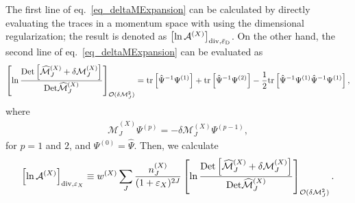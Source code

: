 \documentclass[12pt]{article}
\begin{document}
The first line of eq.~\eqref{eq_deltaMExpansion} can be calculated by
directly evaluating the traces in a momentum space with using the
dimensional regularization; the result is denoted as $\left[\ln
  \mathcal A^{(X)}\right]_{{\rm div}, \bar{\varepsilon}_{\rm D}}$. 
On the other hand, the second line of eq.~\eqref{eq_deltaMExpansion} can
be evaluated as
\begin{align}
 \left[
  \ln\frac{{\rm Det}
   \left[
    \widehat{\mathcal M}^{(X)}_J+\delta\mathcal M_J^{(X)}
   \right]}{{\rm Det} \widehat{\mathcal M}^{(X)}_J}
 \right]_{\mathcal O(\delta\mathcal M_J^2)}
 = {\rm tr}
 \left[
  \hat\Psi^{-1}\Psi^{(1)}
 \right]+{\rm tr}
 \left[
  \hat\Psi^{-1}\Psi^{(2)}
 \right]-\frac{1}{2}{\rm tr}
 \left[
  \hat\Psi^{-1}\Psi^{(1)}\hat\Psi^{-1}\Psi^{(1)}
 \right],
 \label{eq_expansionEachJ}
\end{align}
where
\begin{align}
 \widehat{\mathcal M}^{(X)}_J\Psi^{(p)} = -\delta\mathcal M_J^{(X)}\Psi^{(p-1)},
\end{align}
for $p=1$ and $2$, and $\Psi^{(0)} = \hat\Psi$. Then, we calculate
\begin{align}
  \left[
    \ln\mathcal A^{(X)}
  \right]_{{\rm div}, \varepsilon_{X}}
  \equiv w^{(X)}\sum_J\frac{n^{(X)}_J}{(1+\varepsilon_{X})^{2J}}
  \left[
    \ln\frac{{\rm Det}\left[\widehat{\mathcal M}^{(X)}_J+\delta\mathcal M_J^{(X)}
      \right]}{{\rm Det} \widehat{\mathcal M}^{(X)}_J}
  \right]_{\mathcal O(\delta\mathcal M_J^2)}.
  \label{eq_regDiv}
\end{align}
\end{document}
